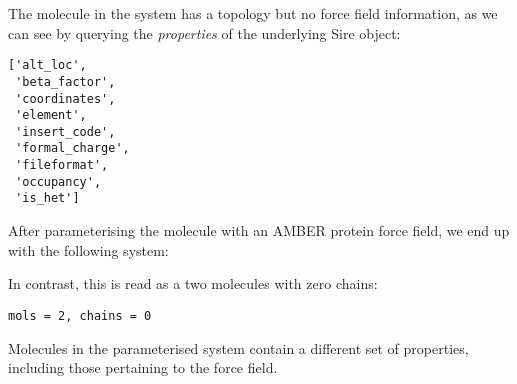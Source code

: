The molecule in the system has a topology but no force field
information, as we can see by querying the \emph{properties} of the
underlying Sire object:

\begin{Shaded}
\begin{Highlighting}[]
\NormalTok{system_pdb[}\NormalTok{]._sire_object.propertyKeys()}
\end{Highlighting}
\end{Shaded}

\begin{verbatim}
['alt_loc',
 'beta_factor',
 'coordinates',
 'element',
 'insert_code',
 'formal_charge',
 'fileformat',
 'occupancy',
 'is_het']
\end{verbatim}

After parameterising the molecule with an AMBER protein force field, we
end up with the following system:

\begin{Shaded}
\begin{Highlighting}[]
\OperatorTok{=}\NormalTok{ BSS.IO.readMolecules([}\NormalTok{, }\NormalTok{])}
\end{Highlighting}
\end{Shaded}

In contrast, this is read as a two molecules with zero chains:

\begin{Shaded}
\begin{Highlighting}[]
\NormalTok{(}\SpecialCharTok{\{}\SpecialCharTok{\}}\SpecialCharTok{\{}\SpecialCharTok{\}}\NormalTok{)}
\end{Highlighting}
\end{Shaded}

\begin{verbatim}
mols = 2, chains = 0
\end{verbatim}

Molecules in the parameterised system contain a different set of
properties, including those pertaining to the force field.

\begin{Shaded}
\begin{Highlighting}[]
\NormalTok{system_amber[}\NormalTok{]._sire_object.propertyKeys()}
\end{Highlighting}
\end{Shaded}

